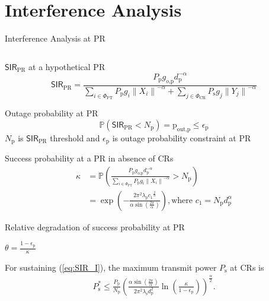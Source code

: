 \documentclass[12pt]{beamer}
\newcommand{\p}{\mathbb P}
\newcommand{\fs}[1]{\fontsize{ #1 pt}{8.2}\selectfont}
\newcommand{\sub}[1]{_{\text{#1}}}
\begin{document}
\section{Interference Analysis}
\begin{frame}[t]{Interference Analysis at PR}
\vspace{-0.2cm}
\begin{columns}
        \begin{column}{0.55\paperwidth}
        \begin{overlayarea}{\textwidth}{7.4cm}
	\fs{8}
	\begin{itemize}
	\item $\textsf{SIR}\sub{PR}$ at a hypothetical PR	
	\begin{equation*}
	\textsf{SIR}\sub{PR} = \frac{P\sub{p} g\sub{$o$,p} d\sub{p}^{-\alpha}}{\sum\limits_{i \in \Phi_{\text{PT}}} P\sub{p} g_i {\|X_i\|}^{-\alpha} +  \sum\limits_{j \in \Phi_{\text{CR}}} P\sub{s} g_j {\|Y_j\|}^{-\alpha}} 
		\label{eq:SIR_PR}  
	\end{equation*}
        \item Outage probability at PR 
	\begin{equation}
	\mathbb{P}(\textsf{SIR}\sub{PR} < N\sub{p}) = \text{p}\sub{out,p} \leq \epsilon\sub{p} 
	\label{eq:SIR_I}
	\end{equation}
       	$N\sub{p}$ is $\textsf{SIR}\sub{PR}$ threshold and $\epsilon\sub{p}$ is outage probability constraint at PR
	\only<2>
	{
		\item Success probability at a PR in absence of CRs
			\begin{align*}
			\kappa &= \p \left( \frac{P\sub{p} g\sub{$o$,p} d\sub{p}^{-\alpha}}{\sum\limits_{i \in \Phi_{\text{PT}}} P\sub{p} g_i {\|X_i\|}^{-\alpha}}  > N\sub{p} \right)\\  &= \exp \left( - \frac{2 \pi^2 \lambda_{\text{p}}  {c_1}^\frac{2}{\alpha}}{\alpha \sin \left( \frac{2 \pi}{\alpha}\right)} \right), \text{where $c_1 = N\sub{p} d\sub{p}^{\alpha}$} 
			\label{eq:lem1}
		\end{align*}
		
	}
	{
		\item Relative degradation of success probability at PR 
		\begin{center}
			$\theta = \frac{1 - \epsilon\sub{p}}{\kappa}$ 
		\end{center}
		\item For sustaining (\ref{eq:SIR_I}), the maximum transmit power $P\sub{s}$ at CRs is
	\begin{align*}
		P\sub{s}^{*} \le \frac{P\sub{p}}{N\sub{p}} \left( \frac{\alpha \sin \left( \frac{2 \pi}{\alpha} \right)}{2 \pi^2 \lambda\sub{s} d\sub{p}^{2}  } \ln \left( \frac{\kappa}{1 - \epsilon\sub{p}} \right) \right)^{\frac{\alpha}{2}}.
		\label{eq:tpCR}
	\end{align*}
	}
	\end{itemize}
	\end{overlayarea}


\end{column}
\end{columns}
\end{frame}
\end{document}
